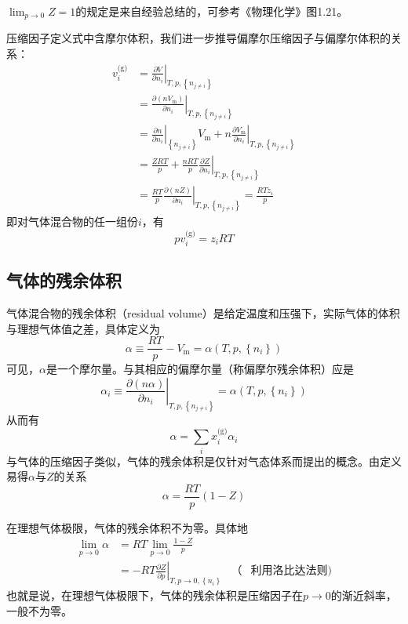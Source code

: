 \documentclass[main.tex]{subfiles}
\begin{document}
$\lim_{p\to 0}Z=1$的规定是来自经验总结的，可参考《物理化学》图1.21。

压缩因子定义式中含摩尔体积，我们进一步推导偏摩尔压缩因子与偏摩尔体积的关系：
\begin{align*}
    v_i^\text{(g)} & =\left.\frac{\partial V}{\partial n_i}\right|_{T,p,\left\{n_{j\neq i}\right\}}                                                                                               \\
                   & =\left.\frac{\partial\left(n V_\text{m}\right)}{\partial n_i}\right|_{T,p,\left\{n_{j\neq i}\right\}}                                                                        \\
                   & =\left.\frac{\partial n}{\partial n_i}\right|_{\left\{n_{j\neq i}\right\}}V_\text{m}+n\left.\frac{\partial V_\text{m}}{\partial n_i}\right|_{T,p,\left\{n_{j\neq i}\right\}} \\
                   & =\frac{ZRT}{p}+\frac{nRT}{p}\left.\frac{\partial Z}{\partial n_i}\right|_{T,p,\left\{n_{j\neq i}\right\}}                                                                    \\
                   & =\frac{RT}{p}\left.\frac{\partial\left(nZ\right)}{\partial n_i}\right|_{T,p,\left\{n_{j\neq i}\right\}}=\frac{RTz_i}{p}
\end{align*}
即对气体混合物的任一组份$i$，有
\[p v_i^\text{(g)}=z_iRT\]

\subsection{气体的残余体积}
气体混合物的残余体积（residual volume）是给定温度和压强下，实际气体的体积与理想气体值之差，具体定义为
\[\alpha\equiv \frac{RT}{p}-V_\text{m}=\alpha\left(T,p,\left\{n_i\right\}\right)\]
可见，$\alpha$是一个摩尔量。与其相应的偏摩尔量（称偏摩尔残余体积）应是
\[\alpha_i\equiv\left.\frac{\partial\left(n\alpha\right)}{\partial n_i}\right|_{T,p,\left\{n_{j\neq i}\right\}}=\alpha\left(T,p,\left\{n_i\right\}\right)\]
从而有
\[\alpha=\sum_i x_i^\text{(g)}\alpha_i\]
与气体的压缩因子类似，气体的残余体积是仅针对气态体系而提出的概念。由定义易得$\alpha$与$Z$的关系
\[\alpha=\frac{RT}{p}\left(1-Z\right)\]

在理想气体极限，气体的残余体积不为零。具体地
\begin{align*}
    \lim_{p\to 0}\alpha & =RT\lim_{p\to 0}\frac{1-Z}{p}                                                                             \\
                        & =-RT\left.\frac{\partial Z}{\partial p}\right|_{T,p\to 0,\left\{n_i\right\}} & \text{（} & \text{利用洛比达法则)}
\end{align*}
也就是说，在理想气体极限下，气体的残余体积是压缩因子在$p\to 0$的渐近斜率，一般不为零。
\end{document}
